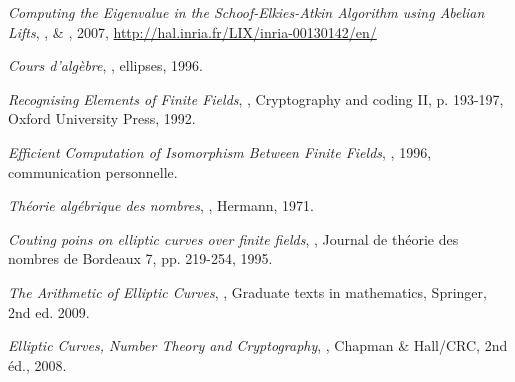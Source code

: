 \documentclass[a4paper]{article} %
\numberwithin{section}{part}
\numberwithin{equation}{section}
\begin{document}
\begin{thebibliography}{LC}
 \emph{Computing the Eigenvalue in the Schoof-Elkies-Atkin
Algorithm using Abelian Lifts}, ,  \&
, 2007, 
\url{http://hal.inria.fr/LIX/inria-00130142/en/}

 \emph{Cours d'algèbre}, , ellipses, 1996.

 \emph{Recognising Elements of Finite Fields}, , Cryptography and coding II, p. 193-197, Oxford University Press, 1992.

 \emph{Efficient Computation of Isomorphism Between Finite Fields},
, 1996, communication personnelle.

 \emph{Théorie algébrique des nombres}, , 
Hermann, 1971.

 \emph{Couting poins on elliptic curves over finite fields},
, Journal de théorie des nombres de Bordeaux 7, pp. 219-254,
1995.

 \emph{The Arithmetic of Elliptic Curves}, 
, Graduate texts in mathematics, Springer, 2nd ed. 
2009.


 \emph{Elliptic Curves, Number Theory and Cryptography},
, Chapman \& Hall/CRC, 2nd éd., 2008.

\end{thebibliography}
\end{document}
